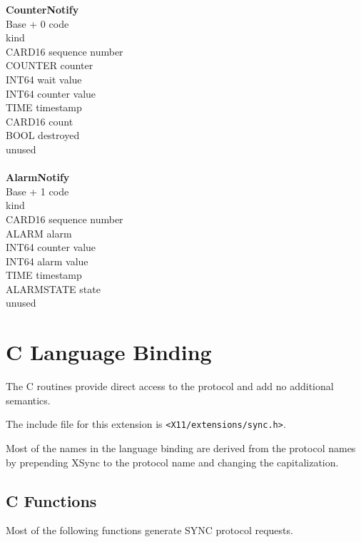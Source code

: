\begin{tabbing}
\tabstopsC
{\bf CounterNotify}\\
		\> Base + 0	\> code \\
				\> kind \\
		\> CARD16	\> sequence number \\
		\> COUNTER	\> counter \\
		\> INT64	\> wait value \\
		\> INT64	\> counter value \\
		\> TIME		\> timestamp \\
		\> CARD16	\> count \\
		\> BOOL		\> destroyed \\
		\> 		\> unused \\
\\
{\bf AlarmNotify}\\
		\> Base + 1	\> code \\
	\> 1			\> kind \\
		\> CARD16	\> sequence number \\
		\> ALARM	\> alarm \\
		\> INT64	\> counter value \\
		\> INT64	\> alarm value \\
		\> TIME		\> timestamp \\
		\> ALARMSTATE	\> state \\
		\>		\> unused\\
\end{tabbing}

\section*{C Language Binding}

The C routines provide direct access to	the protocol and add
no additional semantics.

The include file for this extension is \verb|<X11/extensions/sync.h>|.

Most of the names in the language binding are derived from the
protocol names by prepending XSync to the protocol name and changing
the capitalization.

\subsection*{C Functions}

Most of the following functions generate SYNC protocol requests.

